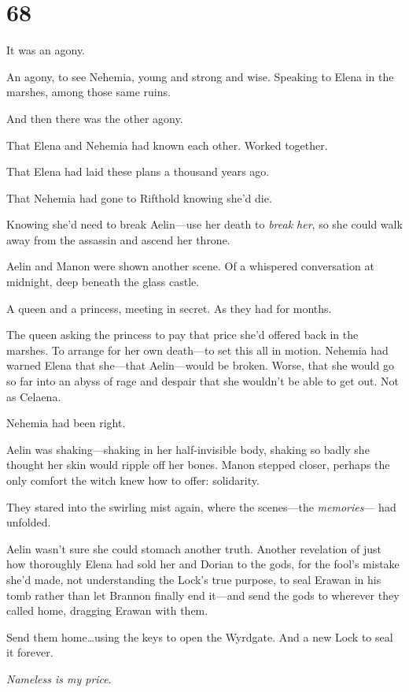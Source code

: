 
\chapter{68}

It was an agony.

An agony, to see Nehemia, young and strong and wise.
Speaking to Elena in the marshes, among those same ruins.

And then there was the other agony.

That Elena and Nehemia had known each other.
Worked together.

That Elena had laid these plans a thousand years ago.

That Nehemia had gone to Rifthold knowing she'd die.

Knowing she'd need to break Aelin---use her death to \emph{break her}, so she could walk away from the assassin and ascend her throne.

Aelin and Manon were shown another scene.
Of a whispered conversation at midnight, deep beneath the glass castle.

A queen and a princess, meeting in secret.
As they had for months.

The queen asking the princess to pay that price she'd offered back in the marshes.
To arrange for her own death---to set this all in motion.
Nehemia had warned Elena that she---that Aelin---would be broken.
Worse, that she would go so far into an abyss of rage and despair that she wouldn't be able to get out.
Not as Celaena.

Nehemia had been right.

Aelin was shaking---shaking in her half-invisible body, shaking so badly she thought her skin would ripple off her bones.
Manon stepped closer, perhaps the only comfort the witch knew how to offer: solidarity.

They stared into the swirling mist again, where the scenes---the \emph{memories}--- had unfolded.

Aelin wasn't sure she could stomach another truth.
Another revelation of just how thoroughly Elena had sold her and Dorian to the gods, for the fool's mistake she'd made, not understanding the Lock's true purpose, to seal Erawan in his tomb rather than let Brannon finally end it---and send the gods to wherever they called home, dragging Erawan with them.

Send them home\ldots using the keys to open the Wyrdgate.
And a new Lock to seal it forever.

\emph{Nameless is my price}.

